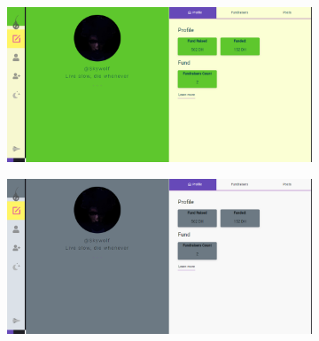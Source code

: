 \begin{figure}
      \centering
      \begin{subfigure}[H]{0.45\textwidth}
          \centering
          \includegraphics[width=\textwidth]{assets/screen-profile-gre.png}
      \end{subfigure}
      \hfill
      \begin{subfigure}[H]{0.45\textwidth}
          \centering
          \includegraphics[width=\textwidth]{assets/screen-profile-grey.png}
      \end{subfigure}
  
 \end{figure}





